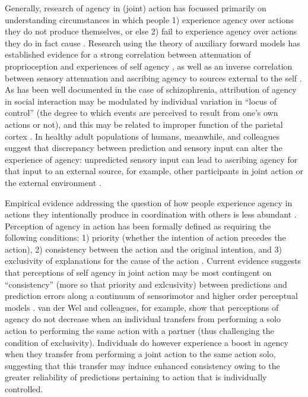 \begin{CJK}{UTF8}{gbsn}
Generally, research of agency in (joint) action has focussed primarily on understanding circumstances in which people 1) experience agency over actions they do not produce themselves, or else 2) fail to experience agency over actions they do in fact cause \citep[see][]{VanderWel2012}.  Research using the theory of auxiliary forward models has established evidence for a strong correlation between attenuation of proprioception and experiences of self agency \citep{Wolpert2003,Sato2008}, as well as an inverse correlation between sensory attenuation and ascribing agency to sources external to the self \citep{Brown2013}.  As has been well documented in the case of schizophrenia, attribution of agency in social interaction may be modulated by individual variation in ``locus of control'' (the degree to which events are perceived to result from one’s own actions or not), and this may be related to improper function of the parietal cortex \citep{Frith2000}. In healthy adult populations of humans, meanwhile, \textcite{Sato2008} and colleagues suggest that discrepancy between prediction and sensory input can alter the experience of agency:  unpredicted sensory input can lead to ascribing agency for that input to an external source, for example, other participants in joint action or the external environment \citep{Sato2005,Frith2007}.

Empirical evidence addressing the question of how people experience agency in actions they intentionally produce in coordination with others is less abundant \citep[but see]{VanderWel2012,VanderWel2009}. Perception of agency in action has been formally defined as requiring the following conditions: 1) priority (whether the intention of action precedes the action), 2) consistency between the action and the original intention, and 3) exclusivity of explanations for the cause of the action \citep{Wegner1999}.  Current evidence suggests that perceptions of self agency in joint action may be most contingent on ``consistency'' (more so that priority and exlcusivity) between predictions and prediction errors along a continuum of sensorimotor and higher order perceptual models \citep[see][]{VanderWel2012}.  van der Wel and colleagues, for example, show that perceptions of agency do not decrease when an individual transfers from performing a solo action to performing the same action with a partner (thus challenging the condition of exclusivity).  Individuals do however experience a boost in agency when they transfer from performing a joint action to the same action solo, suggesting that this transfer may induce enhanced consistency owing to the greater reliability of predictions pertaining to action that is individually controlled.


\end{CJK}
